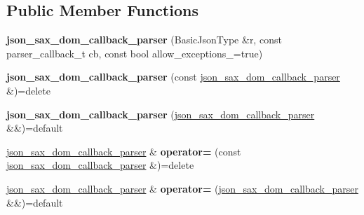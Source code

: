 \subsection*{Public Member Functions}
\begin{DoxyCompactItemize}
\item 
\mbox{\label{classnlohmann_1_1detail_1_1json__sax__dom__callback__parser_afec9434e54590f10df51b062973d4daf}} 
{\bfseries json\+\_\+sax\+\_\+dom\+\_\+callback\+\_\+parser} (Basic\+Json\+Type \&r, const parser\+\_\+callback\+\_\+t cb, const bool allow\+\_\+exceptions\+\_\+=true)
\item 
\mbox{\label{classnlohmann_1_1detail_1_1json__sax__dom__callback__parser_a589998730e650a425b1b311e2e9f7f09}} 
{\bfseries json\+\_\+sax\+\_\+dom\+\_\+callback\+\_\+parser} (const \mbox{\hyperlink{classnlohmann_1_1detail_1_1json__sax__dom__callback__parser}{json\+\_\+sax\+\_\+dom\+\_\+callback\+\_\+parser}} \&)=delete
\item 
\mbox{\label{classnlohmann_1_1detail_1_1json__sax__dom__callback__parser_af1ce6c746e3ebadb7994170725fcdbb5}} 
{\bfseries json\+\_\+sax\+\_\+dom\+\_\+callback\+\_\+parser} (\mbox{\hyperlink{classnlohmann_1_1detail_1_1json__sax__dom__callback__parser}{json\+\_\+sax\+\_\+dom\+\_\+callback\+\_\+parser}} \&\&)=default
\item 
\mbox{\label{classnlohmann_1_1detail_1_1json__sax__dom__callback__parser_a5c9603e79a71713f5e8cf12cba837dbb}} 
\mbox{\hyperlink{classnlohmann_1_1detail_1_1json__sax__dom__callback__parser}{json\+\_\+sax\+\_\+dom\+\_\+callback\+\_\+parser}} \& {\bfseries operator=} (const \mbox{\hyperlink{classnlohmann_1_1detail_1_1json__sax__dom__callback__parser}{json\+\_\+sax\+\_\+dom\+\_\+callback\+\_\+parser}} \&)=delete
\item 
\mbox{\label{classnlohmann_1_1detail_1_1json__sax__dom__callback__parser_a60753ffbec958de15de807852e62cde8}} 
\mbox{\hyperlink{classnlohmann_1_1detail_1_1json__sax__dom__callback__parser}{json\+\_\+sax\+\_\+dom\+\_\+callback\+\_\+parser}} \& {\bfseries operator=} (\mbox{\hyperlink{classnlohmann_1_1detail_1_1json__sax__dom__callback__parser}{json\+\_\+sax\+\_\+dom\+\_\+callback\+\_\+parser}} \&\&)=default

\end{DoxyCompactItemize}
